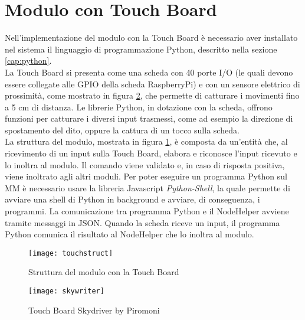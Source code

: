 \section{Modulo con Touch Board}\label{cap:touch}
Nell'implementazione del modulo con la Touch Board \`e necessario aver installato nel sistema
il linguaggio di programmazione Python, descritto nella sezione \ref{cap:python}.\\
La Touch Board si presenta come una scheda con 40 porte I/O (le quali devono essere collegate alle
GPIO della scheda RaspberryPi) e con un sensore elettrico di prossimit\`a, come mostrato in figura \ref{fig:TouchBoard}, che permette di catturare i movimenti fino a
5 cm di distanza.
Le librerie Python, in dotazione con la scheda, offrono funzioni per catturare i diversi input trasmessi, come ad esempio
la direzione di spostamento del dito, oppure la cattura di un tocco sulla scheda.\\
La struttura del modulo, mostrata in figura \ref{fig:structtouch}, \`e composta da un'entit\`a che, al ricevimento di un input
sulla Touch Board, elabora e riconosce l'input ricevuto e lo inoltra al modulo.
Il comando viene validato e, in caso di risposta positiva, viene inoltrato agli altri moduli.
Per poter eseguire un programma Python sul MM \`e necessario usare la libreria Javascript \emph{Python-Shell}, la quale
permette di avviare una shell di Python in background e avviare, di conseguenza, i programmi.
La comunicazione tra programma Python e il NodeHelper avviene tramite messaggi in JSON. Quando la scheda riceve un input,
il programma Python comunica il risultato al NodeHelper che lo inoltra al modulo.

\begin{figure}[H]
    \texttt{[image: touchstruct]}
    \caption{Struttura del modulo con la Touch Board}
    \label{fig:structtouch}
\end{figure}

\begin{figure}[H]
    \texttt{[image: skywriter]}
    \caption{Touch Board Skydriver by Piromoni}
    \label{fig:TouchBoard}
\end{figure}
